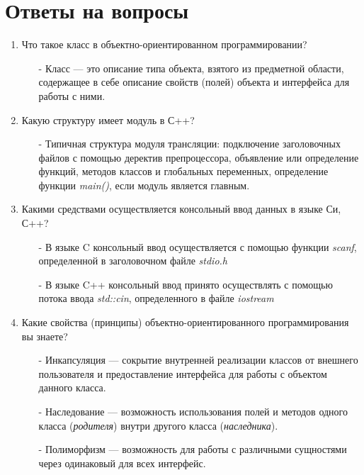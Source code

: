 \documentclass{article}
\begin{document}
\section{Ответы на вопросы}
\begin{enumerate}


	\item Что такое класс в объектно-ориентированном программировании?
	
		\begin{itemize}
		
			\item[-] Класс --- это описание типа объекта, взятого из предметной области, содержащее в себе описание свойств (полей) объекта и интерфейса для работы с ними. 
	
		\end{itemize}
	
	\item Какую структуру имеет модуль в С++?

		\begin{itemize}
		
			\item[-] Типичная структура модуля трансляции: подключение заголовочных файлов с помощью деректив препроцессора, объявление или определение функций, методов классов и глобальных переменных, определение функции \emph{main()}, если модуль является главным.
	
		\end{itemize}
	
	\item Какими средствами осуществляется консольный ввод данных в языке Си, С++?

		\begin{itemize}
		
			\item[-] В языке C консольный ввод осуществляется с помощью функции \emph{scanf}, определенной в заголовочном файле \emph{stdio.h}
			\item[-] В языке C++ консольный ввод принято осуществлять с помощью потока ввода \emph{std::cin}, определенного в файле \emph{iostream}
	
		\end{itemize}
	
	\item Какие свойства (принципы) объектно-ориентированного программирования вы знаете?

		\begin{itemize}
		
			\item[-] Инкапсуляция --- сокрытие внутренней реализации классов от внешнего пользователя и предоставление интерфейса для работы с объектом данного класса.
			\item[-] Наследование --- возможность использования полей и методов одного класса (\emph{родителя}) внутри другого класса (\emph{наследника}).
			\item[-] Полиморфизм --- возможность для работы с различными сущностями через одинаковый для всех интерфейс.
	

\end{itemize}
\end{enumerate}
\end{document}
